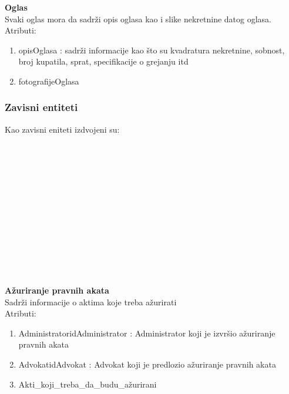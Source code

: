 \documentclass[20pt]{article}
\begin{document}
\newpage
{\bfseries Oglas}\\
Svaki oglas mora da sadr\v {z}i opis oglasa kao i slike nekretnine datog oglasa.\\
\indent Atributi:
\begin{enumerate}
        \item  opisOglasa : sadr\v {z}i informacije kao \v {s}to su kvadratura nekretnine, sobnost, broj kupatila, sprat, specifikacije o grejanju itd
        \item  fotografijeOglasa
\end{enumerate}

\subsubsection{\bfseries \large Zavisni entiteti}
Kao zavisni eniteti izdvojeni su:\\
\\
\\
\\
\\
\\
\\
\\
\\
\\
\\
\\
\\
\\
\newpage
{\bfseries A\v {z}uriranje pravnih akata}\\
Sadr\v {z}i informacije o aktima koje treba a\v {z}urirati\\
\indent Atributi:
\begin{enumerate}
        \item  AdministratoridAdministrator : Administrator koji je izvr\v {s}io a\v {z}uriranje pravnih akata
        \item  AdvokatidAdvokat : Advokat koji je predlozio a\v {z}uriranje pravnih akata
        \item  Akti\_koji\_treba\_da\_budu\_a\v {z}urirani
\end{enumerate}
\end{document}
